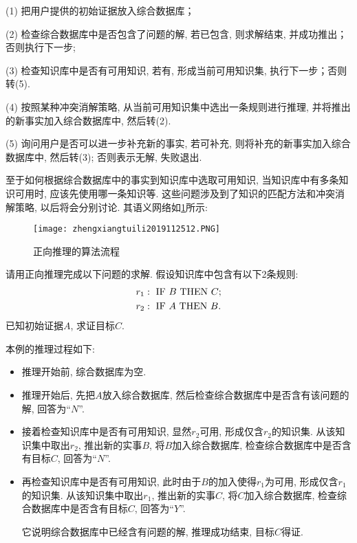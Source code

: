 (1) 把用户提供的初始证据放入综合数据库；

(2) 检查综合数据库中是否包含了问题的解, 若已包含, 则求解结束, 并成功推出；否则执行下一步;

(3) 检查知识库中是否有可用知识, 若有, 形成当前可用知识集, 执行下一步；否则转(5).

(4) 按照某种冲突消解策略, 从当前可用知识集中选出一条规则进行推理, 并将推出的新事实加入综合数据库中, 然后转(2).

(5) 询问用户是否可以进一步补充新的事实, 若可补充, 则将补充的新事实加入综合数据库中, 然后转(3); 否则表示无解, 失败退出.

至于如何根据综合数据库中的事实到知识库中选取可用知识, 当知识库中有多条知识可用时, 应该先使用哪一条知识等. 这些问题涉及到了知识的匹配方法和冲突消解策略, 以后将会分别讨论.
其语义网络如\ref{AI32fig12}所示:
\begin{figure}[H]
\centering
\texttt{[image: zhengxiangtuili2019112512.PNG]}
\caption{正向推理的算法流程}
\label{AI32fig12}
\end{figure}
\begin{example}
请用正向推理完成以下问题的求解. 假设知识库中包含有以下2条规则:
\begin{align*}
            &r_1: \,\,   \textup{IF}\,\,     B\,\,     \textup{THEN}\,\,     C;\\
            &r_2: \,\,   \textup{IF}\,\,     A\,\,     \textup{THEN}\,\,     B.
\end{align*}
已知初始证据$A$, 求证目标$C$.
\end{example}
\begin{result}
本例的推理过程如下:
\begin{itemize}
\item 推理开始前, 综合数据库为空.
\item 推理开始后, 先把$A$放入综合数据库, 然后检查综合数据库中是否含有该问题的解, 回答为“$N$”.
\item 接着检查知识库中是否有可用知识, 显然$r_2$可用, 形成仅含$r_2$的知识集. 从该知识集中取出$r_2$, 推出新的实事$B$, 将$B$加入综合数据库, 检查综合数据库中是否含有目标$C$, 回答为“$N$”.
\item 再检查知识库中是否有可用知识, 此时由于$B$的加入使得$r_1$为可用, 形成仅含$r_1$的知识集. 从该知识集中取出$r_1$, 推出新的实事$C$, 将$C$加入综合数据库, 检查综合数据库中是否含有目标$C$, 回答为“$Y$”.

它说明综合数据库中已经含有问题的解, 推理成功结束, 目标$C$得证.
\end{itemize}
\end{result}
